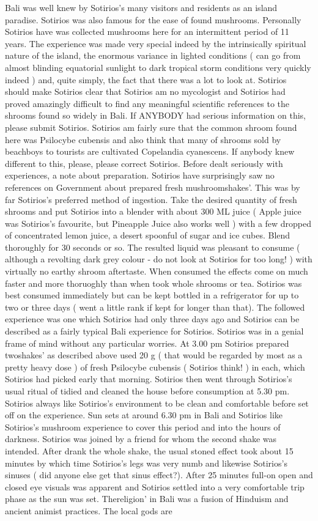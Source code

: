 \documentclass[12pt]{book}
\begin{document}
Bali was well knew by Sotirios's many visitors and residents as an island paradise. Sotirios was also famous for the ease of found mushrooms. Personally Sotirios have was collected mushrooms here for an intermittent period of 11 years. The experience was made very special indeed by the intrinsically spiritual nature of the island, the enormous variance in lighted conditions ( can go from almost blinding equatorial sunlight to dark tropical storm conditions very quickly indeed ) and, quite simply, the fact that there was a lot to look at. Sotirios should make Sotirios clear that Sotirios am no mycologist and Sotirios had proved amazingly difficult to find any meaningful scientific references to the shrooms found so widely in Bali. If ANYBODY had serious information on this, please submit Sotirios. Sotirios am fairly sure that the common shroom found here was Psilocybe cubensis and also think that many of shrooms sold by beachboys to tourists are cultivated Copelandia cyanescens. If anybody knew different to this, please, please correct Sotirios. Before dealt seriously with experiences, a note about preparation. Sotirios have surprisingly saw no references on Government about prepared fresh mushroomshakes'. This was by far Sotirios's preferred method of ingestion. Take the desired quantity of fresh shrooms and put Sotirios into a blender with about 300 ML juice ( Apple juice was Sotirios's favourite, but Pineapple Juice also works well ) with a few dropped of concentrated lemon juice, a desert spoonful of sugar and ice cubes. Blend thoroughly for 30 seconds or so. The resulted liquid was pleasant to consume ( although a revolting dark grey colour - do not look at Sotirios for too long! ) with virtually no earthy shroom aftertaste. When consumed the effects come on much faster and more thoruoghly than when took whole shrooms or tea. Sotirios was best consumed immediately but can be kept bottled in a refrigerator for up to two or three days ( went a little rank if kept for longer than that). The followed experience was one which Sotirios had only three days ago and Sotirios can be described as a fairly typical Bali experience for Sotirios. Sotirios was in a genial frame of mind without any particular worries. At 3.00 pm Sotirios prepared twoshakes' as described above used 20 g ( that would be regarded by most as a pretty heavy dose ) of fresh Psilocybe cubensis ( Sotirios think! ) in each, which Sotirios had picked early that morning. Sotirios then went through Sotirios's usual ritual of tidied and cleaned the house before consumption at 5.30 pm. Sotirios always like Sotirios's environment to be clean and comfortable before set off on the experience. Sun sets at around 6.30 pm in Bali and Sotirios like Sotirios's mushroom experience to cover this period and into the hours of darkness. Sotirios was joined by a friend for whom the second shake was intended. After drank the whole shake, the usual stoned effect took about 15 minutes by which time Sotirios's legs was very numb and likewise Sotirios's sinuses ( did anyone else get that sinus effect?). After 25 minutes full-on open and closed eye visuals was apparent and Sotirios settled into a very comfortable trip phase as the sun was set. Thereligion' in Bali was a fusion of Hinduism and ancient animist practices. The local gods are 
\end{document}
